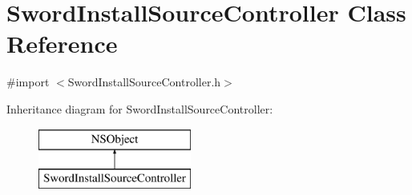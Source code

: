 \hypertarget{interface_sword_install_source_controller}{\section{Sword\-Install\-Source\-Controller Class Reference}
\label{interface_sword_install_source_controller}
}


{\ttfamily \#import $<$Sword\-Install\-Source\-Controller.\-h$>$}

Inheritance diagram for Sword\-Install\-Source\-Controller\-:\begin{figure}[H]
\begin{center}
\leavevmode
\includegraphics[height=2.000000cm]{interface_sword_install_source_controller}
\end{center}
\end{figure}
